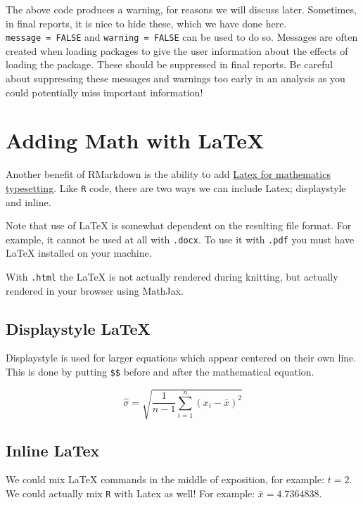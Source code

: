 \documentclass[
]{book}
\theoremstyle{definition}
\theoremstyle{definition}
\theoremstyle{definition}
\theoremstyle{definition}
\theoremstyle{remark}
\begin{document}
The above code produces a warning, for reasons we will discuss later. Sometimes, in final reports, it is nice to hide these, which we have done here. \texttt{message\ =\ FALSE} and \texttt{warning\ =\ FALSE} can be used to do so. Messages are often created when loading packages to give the user information about the effects of loading the package. These should be suppressed in final reports. Be careful about suppressing these messages and warnings too early in an analysis as you could potentially miss important information!

\hypertarget{adding-math-with-latex}{%
\section{Adding Math with LaTeX}\label{adding-math-with-latex}}

Another benefit of RMarkdown is the ability to add \href{https://www.latex-project.org/about/}{Latex for mathematics typesetting}. Like \texttt{R} code, there are two ways we can include Latex; displaystyle and inline.

Note that use of LaTeX is somewhat dependent on the resulting file format. For example, it cannot be used at all with \texttt{.docx}. To use it with \texttt{.pdf} you must have LaTeX installed on your machine.

With \texttt{.html} the LaTeX is not actually rendered during knitting, but actually rendered in your browser using MathJax.

\hypertarget{displaystyle-latex}{%
\subsection{Displaystyle LaTeX}\label{displaystyle-latex}}

Displaystyle is used for larger equations which appear centered on their own line. This is done by putting \texttt{\$\$} before and after the mathematical equation.

\[
\widehat \sigma = \sqrt{\frac{1}{n - 1}\sum_{i=1}^{n}(x_i - \bar{x})^2}
\]

\hypertarget{inline-latex}{%
\subsection{Inline LaTex}\label{inline-latex}}

We could mix LaTeX commands in the middle of exposition, for example: \(t = 2\). We could actually mix \texttt{R} with Latex as well! For example: \(\bar{x} = 4.7364838\).
\end{document}
